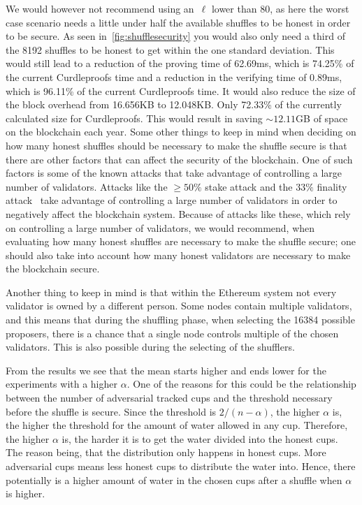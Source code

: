 We would however not recommend using an~$\ell$ lower than 80, as here the worst case scenario needs a little under half the available shuffles to be honest in order to be secure.
As seen in~\autoref{fig:shufflesecurity} you would also only need a third of the 8192 shuffles to be honest to get within the one standard deviation.
This would still lead to a reduction of the proving time of 62.69ms, which is 74.25\% of the current Curdleproofs time and a reduction in the verifying time of 0.89ms, which is 96.11\% of the current Curdleproofs time.
It would also reduce the size of the block overhead from 16.656KB to 12.048KB.
Only 72.33\% of the currently calculated size for Curdleproofs.
This would result in saving $\sim 12.11$GB of space on the blockchain each year.
Some other things to keep in mind when deciding on how many honest shuffles should be necessary to make the shuffle secure is that there are other factors that can affect the security of the blockchain.
One of such factors is some of the known attacks that take advantage of controlling a large number of validators.
Attacks like the $\geq50\%$ stake attack and the $33\%$ finality attack~\cite{EthereumAttackDefense2024} take advantage of controlling a large number of validators in order to negatively affect the blockchain system.
Because of attacks like these, which rely on controlling a large number of validators, we would recommend, when evaluating how many honest shuffles are necessary to make the shuffle secure; one should also take into account how many honest validators are necessary to make the blockchain secure.

Another thing to keep in mind is that within the Ethereum system not every validator is owned by a different person.
Some nodes contain multiple validators, and this means that during the shuffling phase, when selecting the 16384 possible proposers, there is a chance that a single node controls multiple of the chosen validators.
This is also possible during the selecting of the shufflers.

From the results we see that the mean starts higher and ends lower for the experiments with a higher $\alpha$.
One of the reasons for this could be the relationship between the number of adversarial tracked cups and the threshold necessary before the shuffle is secure.
Since the threshold is $2/(n-\alpha)$, the higher $\alpha$ is, the higher the threshold for the amount of water allowed in any cup.
Therefore, the higher $\alpha$ is, the harder it is to get the water divided into the honest cups.
The reason being, that the distribution only happens in honest cups. 
More adversarial cups means less honest cups to distribute the water into.
Hence, there potentially is a higher amount of water in the chosen cups after a shuffle when $\alpha$ is higher. 

